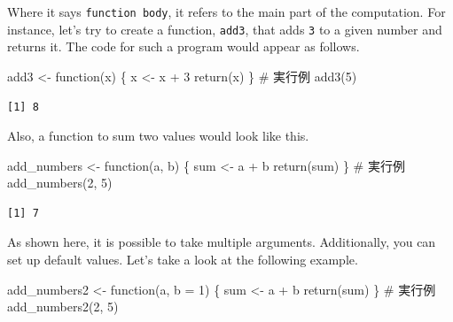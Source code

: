 \documentclass[
  a4paper,
]{book}
\newenvironment{Shaded}{\begin{snugshade}}{\end{snugshade}}
\newcommand{\AttributeTok}[1]{\textcolor[rgb]{0.40,0.45,0.13}{#1}}
\newcommand{\CommentTok}[1]{\textcolor[rgb]{0.37,0.37,0.37}{#1}}
\newcommand{\ControlFlowTok}[1]{\textcolor[rgb]{0.00,0.23,0.31}{#1}}
\newcommand{\DecValTok}[1]{\textcolor[rgb]{0.68,0.00,0.00}{#1}}
\newcommand{\FunctionTok}[1]{\textcolor[rgb]{0.28,0.35,0.67}{#1}}
\newcommand{\NormalTok}[1]{\textcolor[rgb]{0.00,0.23,0.31}{#1}}
\newcommand{\OtherTok}[1]{\textcolor[rgb]{0.00,0.23,0.31}{#1}}
\newcommand{\SpecialCharTok}[1]{\textcolor[rgb]{0.37,0.37,0.37}{#1}}
\begin{document}
Where it says \texttt{function\ body}, it refers to the main part of the
computation. For instance, let's try to create a function,
\texttt{add3}, that adds \texttt{3} to a given number and returns it.
The code for such a program would appear as follows.

\begin{Shaded}
\begin{Highlighting}[]
\NormalTok{add3 }\OtherTok{\textless{}{-}} \ControlFlowTok{function}\NormalTok{(x) \{}
\NormalTok{  x }\OtherTok{\textless{}{-}}\NormalTok{ x }\SpecialCharTok{+} \DecValTok{3}
  \FunctionTok{return}\NormalTok{(x)}
\NormalTok{\}}
\CommentTok{\# 実行例}
\FunctionTok{add3}\NormalTok{(}\DecValTok{5}\NormalTok{)}
\end{Highlighting}
\end{Shaded}

\begin{verbatim}
[1] 8
\end{verbatim}

Also, a function to sum two values would look like this.

\begin{Shaded}
\begin{Highlighting}[]
\NormalTok{add\_numbers }\OtherTok{\textless{}{-}} \ControlFlowTok{function}\NormalTok{(a, b) \{}
\NormalTok{  sum }\OtherTok{\textless{}{-}}\NormalTok{ a }\SpecialCharTok{+}\NormalTok{ b}
  \FunctionTok{return}\NormalTok{(sum)}
\NormalTok{\}}
\CommentTok{\# 実行例}
\FunctionTok{add\_numbers}\NormalTok{(}\DecValTok{2}\NormalTok{, }\DecValTok{5}\NormalTok{)}
\end{Highlighting}
\end{Shaded}

\begin{verbatim}
[1] 7
\end{verbatim}

As shown here, it is possible to take multiple arguments. Additionally,
you can set up default values. Let's take a look at the following
example.

\begin{Shaded}
\begin{Highlighting}[]
\NormalTok{add\_numbers2 }\OtherTok{\textless{}{-}} \ControlFlowTok{function}\NormalTok{(a, }\AttributeTok{b =} \DecValTok{1}\NormalTok{) \{}
\NormalTok{  sum }\OtherTok{\textless{}{-}}\NormalTok{ a }\SpecialCharTok{+}\NormalTok{ b}
  \FunctionTok{return}\NormalTok{(sum)}
\NormalTok{\}}
\CommentTok{\# 実行例}
\FunctionTok{add\_numbers2}\NormalTok{(}\DecValTok{2}\NormalTok{, }\DecValTok{5}\NormalTok{)}
\end{Highlighting}
\end{Shaded}
\end{document}
